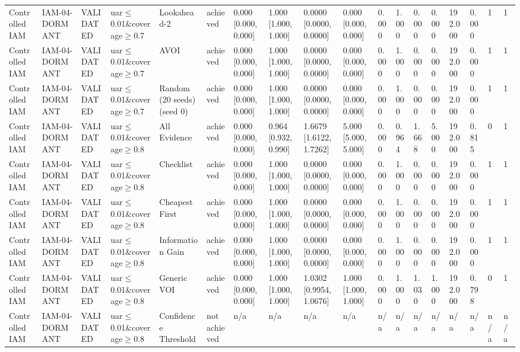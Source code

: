 \begin{table}[!ht]
{\begin{tabular}{llllllllllllllllll}
Controlled IAM & IAM-04-DORMANT & VALIDATED & uar$\le$0.01\&coverage$\ge$0.7 & Lookahead-2 & achieved & 0.000 [0.000, 0.000] & 1.000 [1.000, 1.000] & 0.0000 [0.0000, 0.0000] & 0.000 [0.000, 0.000] & 0.000 & 1.000 & 0.000 & 0.000 & 192.000 & 0.000 & 1 & 1 \\
Controlled IAM & IAM-04-DORMANT & VALIDATED & uar$\le$0.01\&coverage$\ge$0.7 & AVOI & achieved & 0.000 [0.000, 0.000] & 1.000 [1.000, 1.000] & 0.0000 [0.0000, 0.0000] & 0.000 [0.000, 0.000] & 0.000 & 1.000 & 0.000 & 0.000 & 192.000 & 0.000 & 1 & 1 \\
Controlled IAM & IAM-04-DORMANT & VALIDATED & uar$\le$0.01\&coverage$\ge$0.7 & Random (20 seeds) (seed 0) & achieved & 0.000 [0.000, 0.000] & 1.000 [1.000, 1.000] & 0.0000 [0.0000, 0.0000] & 0.000 [0.000, 0.000] & 0.000 & 1.000 & 0.000 & 0.000 & 192.000 & 0.000 & 1 & 1 \\
Controlled IAM & IAM-04-DORMANT & VALIDATED & uar$\le$0.01\&coverage$\ge$0.8 & All Evidence & achieved & 0.000 [0.000, 0.000] & 0.964 [0.932, 0.990] & 1.6679 [1.6122, 1.7262] & 5.000 [5.000, 5.000] & 0.000 & 0.964 & 1.668 & 5.000 & 192.000 & 0.815 & 0 & 1 \\
Controlled IAM & IAM-04-DORMANT & VALIDATED & uar$\le$0.01\&coverage$\ge$0.8 & Checklist & achieved & 0.000 [0.000, 0.000] & 1.000 [1.000, 1.000] & 0.0000 [0.0000, 0.0000] & 0.000 [0.000, 0.000] & 0.000 & 1.000 & 0.000 & 0.000 & 192.000 & 0.000 & 1 & 1 \\
Controlled IAM & IAM-04-DORMANT & VALIDATED & uar$\le$0.01\&coverage$\ge$0.8 & Cheapest First & achieved & 0.000 [0.000, 0.000] & 1.000 [1.000, 1.000] & 0.0000 [0.0000, 0.0000] & 0.000 [0.000, 0.000] & 0.000 & 1.000 & 0.000 & 0.000 & 192.000 & 0.000 & 1 & 1 \\
Controlled IAM & IAM-04-DORMANT & VALIDATED & uar$\le$0.01\&coverage$\ge$0.8 & Information Gain & achieved & 0.000 [0.000, 0.000] & 1.000 [1.000, 1.000] & 0.0000 [0.0000, 0.0000] & 0.000 [0.000, 0.000] & 0.000 & 1.000 & 0.000 & 0.000 & 192.000 & 0.000 & 1 & 1 \\
Controlled IAM & IAM-04-DORMANT & VALIDATED & uar$\le$0.01\&coverage$\ge$0.8 & Generic VOI & achieved & 0.000 [0.000, 0.000] & 1.000 [1.000, 1.000] & 1.0302 [0.9954, 1.0676] & 1.000 [1.000, 1.000] & 0.000 & 1.000 & 1.030 & 1.000 & 192.000 & 0.798 & 0 & 1 \\
Controlled IAM & IAM-04-DORMANT & VALIDATED & uar$\le$0.01\&coverage$\ge$0.8 & Confidence Threshold & not achieved & n/a & n/a & n/a & n/a & n/a & n/a & n/a & n/a & n/a & n/a & n/a & n/a \\

\end{tabular}}
\end{table}
